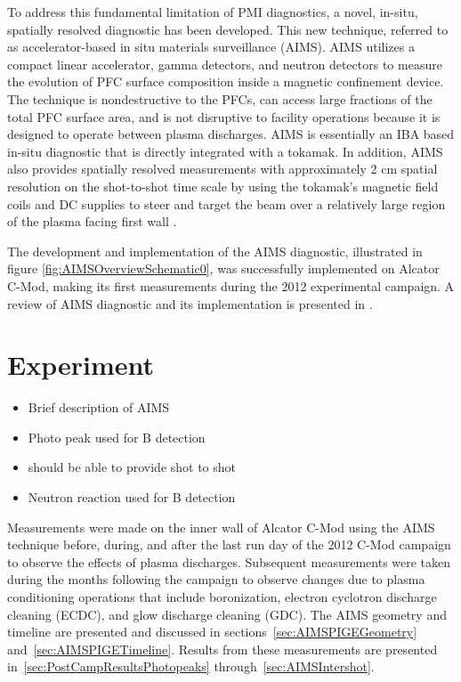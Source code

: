 \documentclass[11pt,a4paper,twocolumn]{article}
\begin{document}
To address this fundamental limitation of PMI diagnostics, a novel, in-situ, spatially resolved diagnostic has been developed.  This new technique, referred to as accelerator-based in situ materials surveillance (AIMS). AIMS utilizes a compact linear accelerator, gamma detectors, and neutron detectors to measure the evolution of PFC surface composition inside a magnetic confinement device. The technique is nondestructive to the PFCs, can access large fractions of the total PFC surface area, and is not disruptive to facility operations because it is designed to operate between plasma discharges.   AIMS is essentially an IBA based in-situ diagnostic that is directly integrated with a tokamak. In addition, AIMS also provides spatially resolved measurements with approximately 2 cm spatial resolution on the shot-to-shot time scale by using the tokamak's magnetic field coils and DC supplies to steer and target the beam over a relatively large region of the plasma facing first wall \cite{RSIPaper}.  %

The development and implementation of the AIMS diagnostic, illustrated in figure \ref{fig:AIMSOverviewSchematic0}, was successfully implemented on Alcator C-Mod, making its first measurements during the 2012 experimental campaign.  A review of AIMS diagnostic and its implementation is presented in \cite{RSIPaper}.  

\section{Experiment}
\begin{itemize}
	\item Brief description of AIMS
	\item Photo peak used for B detection
	\item should be able to provide shot to shot 
	\item Neutron reaction used for B detection
\end{itemize}

Measurements were made on the inner wall of Alcator C-Mod using the AIMS technique before, during, and after the last run day of the 2012 C-Mod campaign to observe the effects of plasma discharges.  Subsequent measurements were taken during the months following the campaign to observe changes due to plasma conditioning operations that include boronization, electron cyclotron discharge cleaning (ECDC), and glow discharge cleaning (GDC).  The AIMS geometry and timeline are presented and discussed in sections~\ref{sec:AIMSPIGEGeometry} and~\ref{sec:AIMSPIGETimeline}.  Results from these measurements are presented in~\ref{sec:PostCampResultsPhotopeaks} through~\ref{sec:AIMSIntershot}.  
\end{document}
